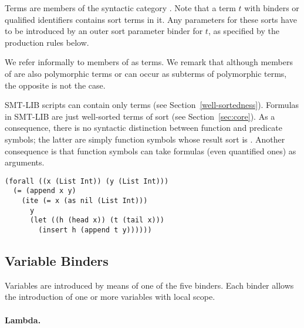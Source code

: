 \cTerms
\bigskip

Terms are members of the syntactic category .
Note that a term $t$ with binders or qualified identifiers contains 
sort terms in it.
Any parameters for these sorts have to be introduced 
by an outer sort parameter binder  for $t$, as specified 
by the production rules below.
\bigskip

\cPterms
\bigskip

We refer informally to members of  as  terms.
We remark that although members of  are also polymorphic terms or 
can occur as subterms of polymorphic terms, the opposite is not the case.


SMT-LIB scripts can contain only  terms
(see Section~\ref{well-sortedness}).
Formulas in SMT-LIB are just well-sorted terms of sort 
 (see Section~\ref{sec:core}).
As a consequence, there is no syntactic distinction 
between function and predicate symbols;
the latter are simply function symbols whose result sort is .
Another consequence is that function symbols can take formulas 
(even quantified ones) as arguments.

\begin{lstlisting}[linewidth=29em]
(forall ((x (List Int)) (y (List Int)))
  (= (append x y)
    (ite (= x (as nil (List Int)))
      y
      (let ((h (head x)) (t (tail x)))
        (insert h (append t y))))))
\end{lstlisting}


\subsection{Variable Binders}  \label{sec:binders}

Variables are introduced by means of one of the five binders.
Each binder allows the introduction of one or more variables with local scope.

\paragraph{Lambda.}


